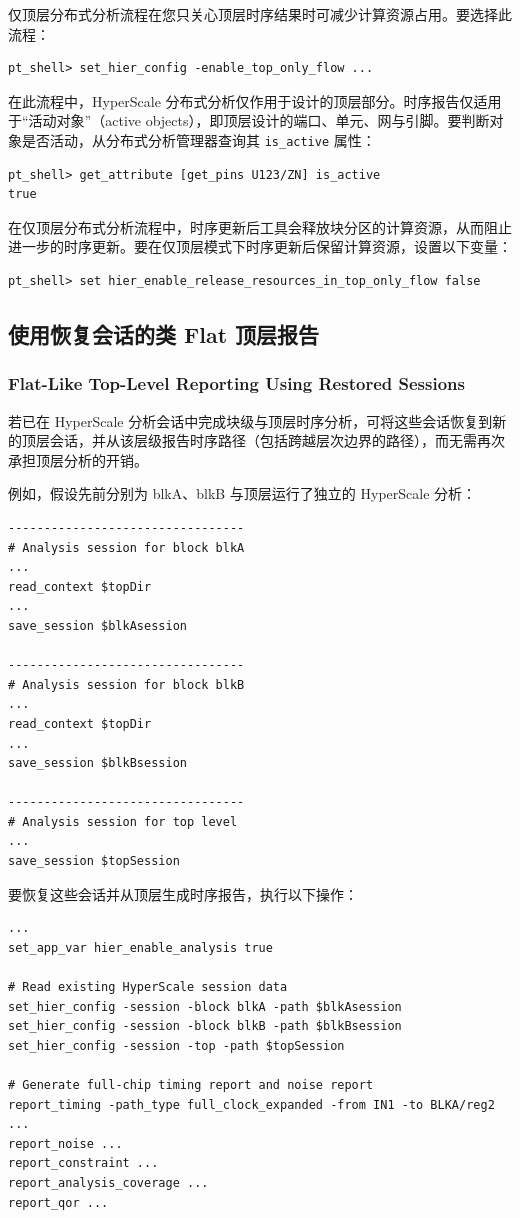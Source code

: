 仅顶层分布式分析流程在您只关心顶层时序结果时可减少计算资源占用。要选择此流程：
\begin{lstlisting}
pt_shell> set_hier_config -enable_top_only_flow ...
\end{lstlisting}

在此流程中，HyperScale 分布式分析仅作用于设计的顶层部分。时序报告仅适用于“活动对象”（active objects），即顶层设计的端口、单元、网与引脚。要判断对象是否活动，从分布式分析管理器查询其 \texttt{is\_active} 属性：
\begin{lstlisting}
pt_shell> get_attribute [get_pins U123/ZN] is_active
true
\end{lstlisting}

在仅顶层分布式分析流程中，时序更新后工具会释放块分区的计算资源，从而阻止进一步的时序更新。要在仅顶层模式下时序更新后保留计算资源，设置以下变量：
\begin{lstlisting}
pt_shell> set hier_enable_release_resources_in_top_only_flow false
\end{lstlisting}

\subsection{使用恢复会话的类 Flat 顶层报告}
\subsubsection*{Flat-Like Top-Level Reporting Using Restored Sessions}

若已在 HyperScale 分析会话中完成块级与顶层时序分析，可将这些会话恢复到新的顶层会话，并从该层级报告时序路径（包括跨越层次边界的路径），而无需再次承担顶层分析的开销。

例如，假设先前分别为 blkA、blkB 与顶层运行了独立的 HyperScale 分析：
\begin{lstlisting}
---------------------------------
# Analysis session for block blkA
...
read_context $topDir
...
save_session $blkAsession

---------------------------------
# Analysis session for block blkB
...
read_context $topDir
...
save_session $blkBsession

---------------------------------
# Analysis session for top level
...
save_session $topSession
\end{lstlisting}

要恢复这些会话并从顶层生成时序报告，执行以下操作：
\begin{lstlisting}
...
set_app_var hier_enable_analysis true

# Read existing HyperScale session data
set_hier_config -session -block blkA -path $blkAsession
set_hier_config -session -block blkB -path $blkBsession
set_hier_config -session -top -path $topSession

# Generate full-chip timing report and noise report
report_timing -path_type full_clock_expanded -from IN1 -to BLKA/reg2 ...
report_noise ...
report_constraint ...
report_analysis_coverage ...
report_qor ...
\end{lstlisting}

